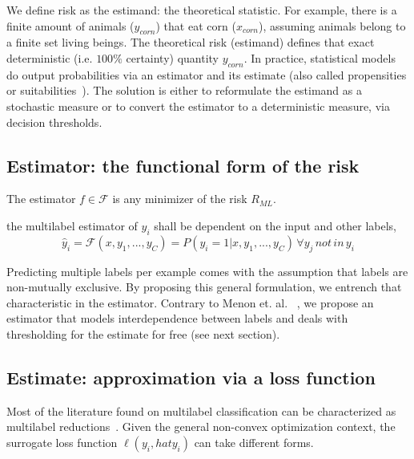 We define risk as the estimand: the theoretical statistic. For example, there is a finite amount of animals ($y_{corn}$) that eat corn ($x_{corn}$), assuming animals belong to a finite set living beings. The theoretical risk (estimand) defines that exact deterministic (i.e. $100\%$ certainty) quantity $y_{corn}$. In practice, statistical models do output probabilities via an estimator and its estimate (also called propensities or suitabilities~\cite{multilabelReduction}). The solution is either to reformulate the estimand as a stochastic measure or to convert the estimator to a deterministic measure, via decision thresholds.

\subsection{Estimator: the functional form of the risk}
\label{section:background:estimator}

The estimator $f \in \mathcal{F}$ is any minimizer of the risk $R_{ML}$. 

\begin{proposition}
the multilabel estimator of $y_i$ shall be dependent on the input and other labels,
\begin{equation}
  \hat{y}_i = \mathcal{F}(x, y_1, ..., y_C) = P(y_i = 1 | x, y_1, ..., y_C) \, \forall y_j \, not \, in \, y_i
\end{equation}
\label{eq:estimand}
\end{proposition}

Predicting multiple labels per example comes with the assumption that labels are non-mutually exclusive. By proposing this general formulation, we entrench that characteristic in the estimator. Contrary to Menon et. al. ~\citep{multilabelReduction}, we propose an estimator that models interdependence between labels and deals with thresholding for the estimate for free (see next section).


\subsection{Estimate: approximation via a loss function}
\label{section:background:estimate}


Most of the literature found on multilabel classification can be characterized as multilabel reductions~\cite{multilabelReduction}. Given the general non-convex optimization context, the surrogate loss function $\ell(y_i, hat{y_i})$ can take different forms. 

